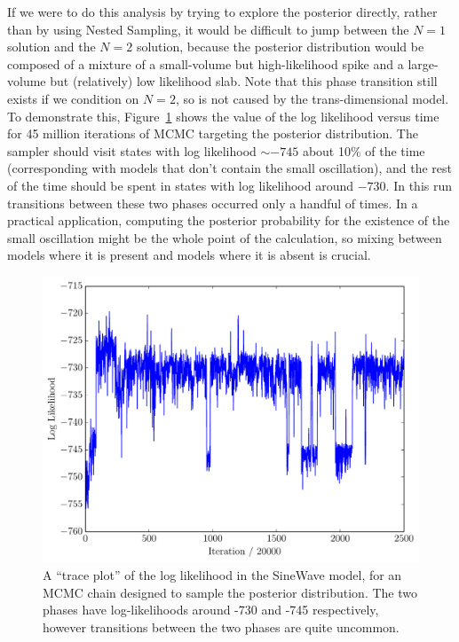 \documentclass[letterpaper, 11pt]{article}
\begin{document}
If we were to do this analysis by trying to explore the posterior directly,
rather than by using Nested Sampling, it would be difficult to jump between
the $N=1$ solution and the $N=2$ solution, because the posterior distribution
would be composed of a mixture of a small-volume but high-likelihood spike
and a large-volume but (relatively) low likelihood
slab. Note that this phase transition still exists if we condition on $N=2$,
so is not caused by the trans-dimensional model. To demonstrate this,
Figure~\ref{fig:trace_logl} shows the value of the log likelihood versus time
for 45 million iterations of MCMC targeting the posterior distribution.
The sampler should visit states with log likelihood $\sim -745$ about 10\%
of the time (corresponding with models that don't contain the small oscillation),
and the rest of the time should be spent in states with log likelihood around
$-730$. In this run transitions between these two phases occurred only a
handful of times. In a practical application, computing the posterior probability
for the existence of the small oscillation might be the whole point of the
calculation, so mixing between models where it is present and models where it
is absent is crucial.

\begin{figure}
\begin{center}
\includegraphics[scale=0.5]{trace_logl.pdf}
\caption{A ``trace plot'' of the log likelihood in the SineWave model, for an
MCMC chain designed to sample the posterior distribution. The two phases
have log-likelihoods around -730 and -745 respectively, however transitions
between the two phases are quite uncommon.
\label{fig:trace_logl}}
\end{center}
\end{figure}
\end{document}
